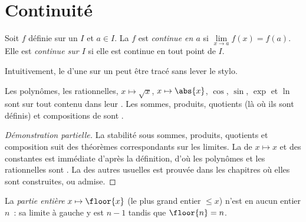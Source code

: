 \section{Continuité}

\begin{definition}[Continuité]\label{def:g12:limcont:continuity}
Soit $f$ définie sur un  $I$ et $a \in I$. La  $f$ est
\emph{continue en $a$} si
$\lim\limits_{x \to a} f(x) = f(a)$. Elle est \emph{continue sur $I$} si
elle est continue en tout point de $I$.
\end{definition}

Intuitivement, le  d'une   sur un  peut
être tracé sans lever le stylo.

\begin{proposition}\label{prop:g12:limcont:usual}
Les polynômes, les  rationnelles, $x \mapsto \sqrt{x}$,
$x \mapsto \abs{x}$, $\cos$, $\sin$, $\exp$ et $\ln$ sont  sur
tout  contenu dans leur . Les sommes,
produits, quotients (là où ils sont définis) et compositions de 
 sont .
\end{proposition}

\begin{proof}[Démonstration partielle]
La stabilité sous sommes, produits, quotients et composition suit des
théorèmes correspondants sur les limites. La  de
$x \mapsto x$ et des constantes est immédiate d'après la définition, d'où
les polynômes et les  rationnelles sont . La 
des autres  usuelles est prouvée dans les chapitres où elles sont
construites, ou admise.
\end{proof}

\begin{example}
La \emph{ partie entière} $x \mapsto \floor{x}$ (le plus grand
entier $\leq x$) n'est  en aucun entier $n$~: sa limite à gauche y
est $n - 1$ tandis que $\floor{n} = n$.
\end{example}

